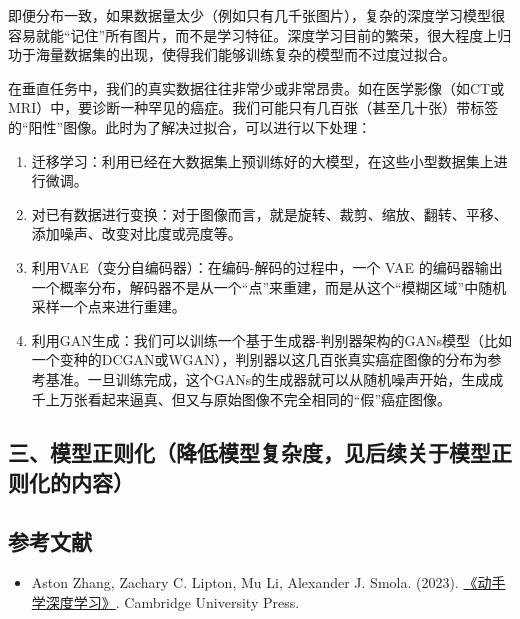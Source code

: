 即便分布一致，如果数据量太少（例如只有几千张图片），复杂的深度学习模型很容易就能``记住''所有图片，而不是学习特征。深度学习目前的繁荣，很大程度上归功于海量数据集的出现，使得我们能够训练复杂的模型而不过度过拟合。

在垂直任务中，我们的真实数据往往非常少或非常昂贵。如在医学影像（如CT或MRI）中，要诊断一种罕见的癌症。我们可能只有几百张（甚至几十张）带标签的``阳性''图像。此时为了解决过拟合，可以进行以下处理：

\begin{enumerate}
\def\labelenumi{\arabic{enumi}.}
\item
  迁移学习：利用已经在大数据集上预训练好的大模型，在这些小型数据集上进行微调。
\item
  对已有数据进行变换：对于图像而言，就是旋转、裁剪、缩放、翻转、平移、添加噪声、改变对比度或亮度等。
\item
  利用VAE（变分自编码器）：在编码-解码的过程中，一个 VAE 的编码器输出一个概率分布，解码器不是从一个``点''来重建，而是从这个``模糊区域''中随机采样一个点来进行重建。
\item
  利用GAN生成：我们可以训练一个基于生成器-判别器架构的GANs模型（比如一个变种的DCGAN或WGAN），判别器以这几百张真实癌症图像的分布为参考基准。一旦训练完成，这个GANs的生成器就可以从随机噪声开始，生成成千上万张看起来逼真、但又与原始图像不完全相同的``假''癌症图像。
\end{enumerate}

\hypertarget{ux4e09ux6a21ux578bux6b63ux5219ux5316ux964dux4f4eux6a21ux578bux590dux6742ux5ea6ux89c1ux540eux7eedux5173ux4e8eux6a21ux578bux6b63ux5219ux5316ux7684ux5185ux5bb9}{%
\subsection{三、模型正则化（降低模型复杂度，见后续关于模型正则化的内容）}\label{ux4e09ux6a21ux578bux6b63ux5219ux5316ux964dux4f4eux6a21ux578bux590dux6742ux5ea6ux89c1ux540eux7eedux5173ux4e8eux6a21ux578bux6b63ux5219ux5316ux7684ux5185ux5bb9}}

\hypertarget{ux53c2ux8003ux6587ux732e-2}{%
\subsection{参考文献}\label{ux53c2ux8003ux6587ux732e-2}}

\begin{itemize}
\tightlist
\item
  Aston Zhang, Zachary C. Lipton, Mu Li, Alexander J. Smola. (2023). \href{https://zh.d2l.ai/}{《动手学深度学习》}. Cambridge University Press.
\end{itemize}


